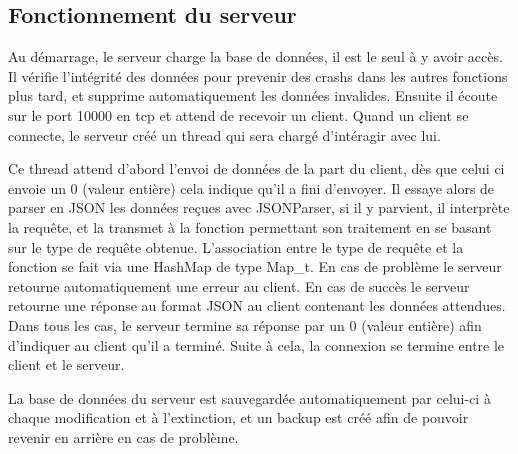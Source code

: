 % 
\subsection{Fonctionnement du serveur}
Au démarrage, le serveur charge la base de données, il est le seul à y avoir accès. Il vérifie l'intégrité des données pour prevenir des crashs dans les autres fonctions plus tard, et supprime automatiquement les données invalides. Ensuite il écoute sur le port 10000 en tcp et attend de recevoir un client. Quand un client se connecte, le serveur créé un thread qui sera chargé d'intéragir avec lui.\par

Ce thread attend d'abord l'envoi de données de la part du client, dès que celui ci envoie un 0 (valeur entière) cela indique qu'il a fini d'envoyer.
Il essaye alors de parser en JSON les données reçues avec JSONParser, si il y parvient, il interprète la requête, et la transmet à la fonction permettant son traitement en se basant sur le type de requête obtenue. L'association entre le type de requête et la fonction se fait via une HashMap de type Map\_t. En cas de problème le serveur retourne automatiquement une erreur au client. En cas de succès le serveur retourne une réponse au format JSON au client contenant les données attendues. Dans tous les cas, le serveur termine sa réponse par un 0 (valeur entière) afin d'indiquer au client qu'il a terminé.
Suite à cela, la connexion se termine entre le client et le serveur.\par

La base de données du serveur est sauvegardée automatiquement par celui-ci à chaque modification et à l'extinction, et un backup est créé afin de pouvoir revenir en arrière en cas de problème.
% 

